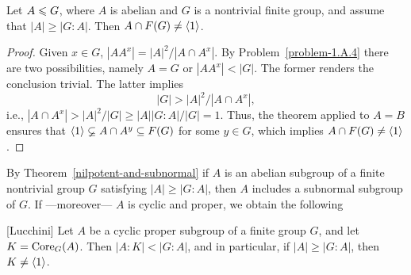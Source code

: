 \begin{cor}\label{abelian-intersects-fitting}
    Let\/ $A\leqslant G$, where\/ $A$ is abelian and\/ $G$ is a nontrivial finite group, and assume that\/ $|A|\ge|G:A|$. Then\/ $A\cap F(G)\ne\langle1\rangle$.
\end{cor}

\begin{proof} Given $x\in G$, $|AA^x|=|A|^2/|A\cap A^x|$. By Problem~\ref{problem-1.A.4} there are two possibilities, namely $A=G$ or $|AA^x|<|G|$. The former renders the conclusion trivial. The latter implies
$$
    |G| > |A|^2/|A\cap A^x|,
$$
i.e., $|A\cap A^x|>|A|^2/|G|\ge |A||G:A|/|G|=1$. Thus, the theorem applied to $A=B$ ensures that $\langle1\rangle\varsubsetneq A\cap A^y\subseteq F(G)$ for some $y\in G$, which implies $A\cap F(G)\ne\langle1\rangle$.  \end{proof}

\begin{rem}
    By\/ {\rm Theorem~\ref{nilpotent-and-subnormal}} if\/ $A$ is an abelian subgroup of a finite nontrivial group\/ $G$ satisfying\/ $|A|\ge|G:A|$, then\/ $A$ includes a subnormal subgroup of\/ $G$. If ---moreover--- $A$ is cyclic and proper, we obtain the following
\end{rem}

\begin{thm}\label{lucchini-thm}
    {\rm[Lucchini]} Let\/ $A$ be a cyclic proper subgroup of a finite group\/ $G$, and let\/ $K={\rm Core}_G(A)$. Then\/ $|A:K|<|G:A|$, and in particular, if\/ $|A|\ge|G:A|$, then\/ $K\ne\langle1\rangle$.
\end{thm}

